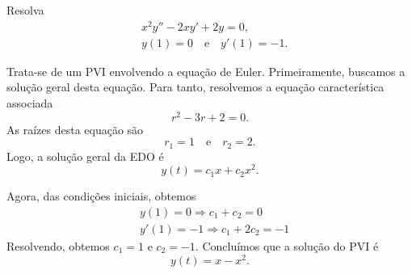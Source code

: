 \begin{exeresol}
  Resolva
  \begin{align}
    & x^2y'' - 2xy' + 2y = 0, \\
    & y(1) = 0\quad\text{e}\quad y'(1) = -1.
  \end{align}
\end{exeresol}
\begin{resol}
  Trata-se de um PVI envolvendo a equação de Euler. Primeiramente, buscamos a solução geral desta equação. Para tanto, resolvemos a equação característica associada
  \begin{equation}
    r^2 - 3r + 2 = 0.
  \end{equation}
  As raízes desta equação são
  \begin{equation}
    r_1 = 1\quad\text{e}\quad r_2 = 2.
  \end{equation}
  Logo, a solução geral da EDO é
  \begin{equation}
    y(t) = c_1x + c_2x^2.
  \end{equation}

  Agora, das condições iniciais, obtemos
  \begin{align}
    & y(1) = 0 \Rightarrow c_1 + c_2 = 0 \\
    & y'(1) = -1 \Rightarrow c_1 + 2c_2 = -1
  \end{align}
  Resolvendo, obtemos $c_1=1$ e $c_2=-1$. Concluímos que a solução do PVI é
  \begin{equation}
    y(t) = x - x^2.
  \end{equation}
\end{resol}

